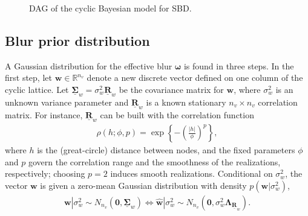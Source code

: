 \documentclass[12pt]{article}
\newcommand{\mycirc}[1] {\underline{\bm{#1}}}
\begin{document}
\begin{figure}[bt]
\centering
{}
\caption{DAG of the cyclic Bayesian model for SBD.}
\label{fig:DAG}
\end{figure}

\subsection{Blur prior distribution} \label{sec:blur_model}
A Gaussian distribution for the effective blur $\bm{\omega}$ is found in three steps. 
In the first step, let $\bm{w} \in \mathbb{R}^{n_{v}}$ denote a new discrete vector defined on one column of the cyclic lattice. 
Let $\mycirc{\Sigma}_w = \sigma_w^2 \mycirc{R}_w$ be the covariance matrix for $\bm{w}$, where $\sigma_{w}^2$ is an unknown variance parameter and $\mycirc{R}_{w}$
is a known stationary $n_v \times n_v$ correlation matrix. For instance, $\mycirc{R}_{w}$ can be built with the correlation function 
\begin{align} \label{eq:correlation}
    \rho(h; \phi, p) = \exp\left\{-\left(\frac{|h|}{\phi}\right)^p\right\},
\end{align}
where $h$ is the (great-circle) distance between nodes, and the fixed parameters $\phi$ and $p$ govern the correlation range and the smoothness of the realizations, respectively; choosing $p=2$ induces smooth realizations.
Conditional on $\sigma_w^2$, the vector $\bm{w}$ is given a zero-mean Gaussian distribution with density $p(\bm{w}|\sigma_w^2)$,
\begin{align} \label{eq:w_prior}
    \bm{w}|\sigma_w^2 \sim N_{n_{v}}(\bm{0}, \mycirc{\Sigma}_{w})
    \iff
    \hat{\bm{w}}|\sigma_w^2 \sim N_{n_{v}}(\bm{0}, \sigma_w^2 \bm{\Lambda}_{\mycirc{R}_{w}}).
\end{align}
\end{document}
